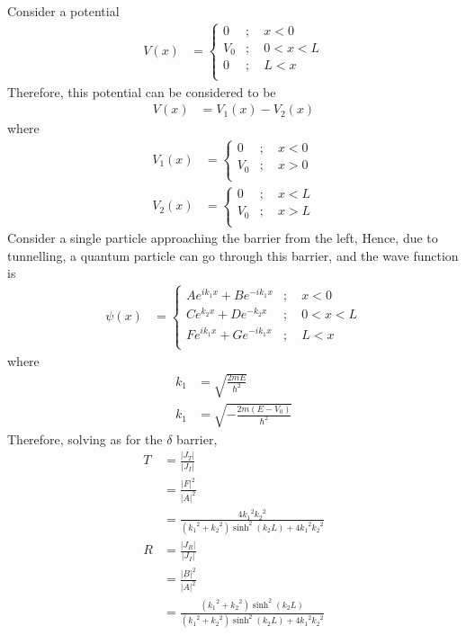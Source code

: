 \documentclass[titlepage, fleqn, a4paper, 12pt, twoside]{article}
\theoremstyle{definition}
\theoremstyle{theorem}
\begin{document}
Consider a potential
\begin{align*}
	V(x) &=
		\begin{cases}
			0 &;\quad x < 0\\
			V_0 &;\quad 0 < x < L\\
			0 &;\quad L < x\\
		\end{cases}
\end{align*}
Therefore, this potential can be considered to be
\begin{align*}
	V(x) &= V_1(x) - V_2(x)
\end{align*}
where
\begin{align*}
	V_1(x) &=
		\begin{cases}
			0 &;\quad x < 0\\
			V_0 &;\quad x > 0\\
		\end{cases}\\
	V_2(x) &=
		\begin{cases}
			0 &;\quad x < L\\
			V_0 &;\quad x > L\\
		\end{cases}
\end{align*}
Consider a single particle approaching the barrier from the left,
Hence, due to tunnelling, a quantum particle can go through this barrier, and the wave function is
\begin{align*}
	\psi(x) &=
		\begin{cases}
			A e^{i k_1 x} + B e^{-i k_1 x} &;\quad x < 0\\
			C e^{k_2 x} + D e^{-k_2 x} &;\quad 0 < x < L\\
			F e^{i k_1 x} + G e^{-i k_1 x} &;\quad L < x\\
		\end{cases}
\end{align*}
where
\begin{align*}
	k_1 &= \sqrt{\frac{2 m E}{\hbar^2}}\\
	k_1 &= \sqrt{-\frac{2 m (E - V_0)}{\hbar^2}}
\end{align*}
Therefore, solving as for the $\delta$ barrier,
\begin{align*}
	T &= \frac{|J_T|}{|J_I|}\\
	&= \frac{|F|^2}{|A|^2}\\
	&= \frac{4 {k_1}^2 {k_2}^2}{\left( {k_1}^2 + {k_2}^2 \right) \sinh^2 (k_2 L) + 4 {k_1}^2 {k_2}^2}\\
	R &= \frac{|J_R|}{|J_I|}\\
	&= \frac{|B|^2}{|A|^2}\\
	&= \frac{\left( {k_1}^2 + {k_2}^2 \right) \sinh^2 (k_2 L)}{\left( {k_1}^2 + {k_2}^2 \right) \sinh^2 (k_2 L) + 4 {k_1}^2 {k_2}^2}
\end{align*}
\end{document}
